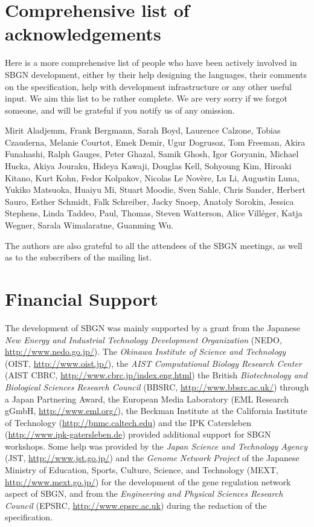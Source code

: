 \section{Comprehensive list of acknowledgements}

Here is a more comprehensive list of people who have been actively involved in SBGN development, either by their help designing the languages, their comments on the specification, help with development infrastructure or any other useful input.  We aim this list to be rather complete. We are very sorry if we forgot someone, and will be grateful if you notify us of any omission.

Mirit Aladjemm, Frank Bergmann, Sarah Boyd, Laurence Calzone, Tobias Czauderna, Melanie Courtot, Emek Demir, Ugur Dogrusoz, Tom Freeman, Akira Funahashi, Ralph
Gauges, Peter Ghazal, Samik Ghosh, Igor Goryanin, Michael Hucka, Akiya Jouraku, Hideya Kawaji, Douglas Kell, Sohyoung Kim, Hiroaki Kitano, Kurt
Kohn, Fedor Kolpakov, Nicolas Le Nov\`{e}re, Lu Li, Augustin Luna, Yukiko Matsuoka, Huaiyu Mi, Stuart Moodie, Sven Sahle, Chris Sander, Herbert
Sauro, Esther Schmidt, Falk Schreiber, Jacky Snoep, Anatoly Sorokin, Jessica Stephens, Linda Taddeo, Paul, Thomas, Steven Watterson, Alice Vill\'{e}ger, Katja
Wegner, Sarala Wimalaratne, Guanming Wu.

The authors are also grateful to all the attendees of the SBGN meetings, as well as to the subscribers of the  mailing list.

\section{Financial Support}

The development of SBGN was mainly supported by a grant from the Japanese \emph{New Energy and Industrial Technology Development Organization} (NEDO, \url{http://www.nedo.go.jp/}). The \emph{Okinawa Institute of Science and Technology} (OIST, \url{http://www.oist.jp/}), the \emph{AIST Computational Biology Research Center} (AIST CBRC, \url{http://www.cbrc.jp/index.eng.html}) the British \emph{Biotechnology and Biological Sciences Research Council} (BBSRC, \url{http://www.bbsrc.ac.uk/}) through a Japan Partnering Award, the European Media Laboratory (EML Research gGmbH, \url{http://www.eml.org/}), the Beckman Institute at the California Institute of Technology (\url{http://bnmc.caltech.edu}) and the IPK Catersleben (\url{http://www.ipk-gatersleben.de}) provided additional support for SBGN workshops.  Some help was provided by the \emph{Japan Science and Technology Agency} (JST, \url{http://www.jst.go.jp/}) and the \emph{Genome Network Project} of the Japanese Ministry of Education, Sports, Culture, Science, and Technology (MEXT, \url{http://www.mext.go.jp/}) for the development of the gene regulation network aspect of SBGN, and from the \emph{Engineering and Physical Sciences Research Council} (EPSRC, \url{http://www.epsrc.ac.uk}) during the redaction of the specification.